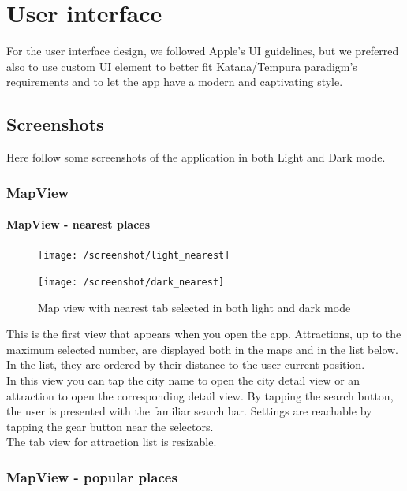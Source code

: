 \documentclass[a4paper, 11pt, parskip=half]{scrreprt}
\theoremstyle{definition}
\begin{document}
\chapter{User interface}
For the user interface design, we followed Apple's UI guidelines, but we preferred also to use custom UI element to better fit Katana/Tempura paradigm's requirements and to let the app have a modern and captivating style.  

\section{Screenshots}
Here follow some screenshots of the application in both Light and Dark mode.

\label{section:mapview}
\subsection{MapView}

\subsubsection{MapView - nearest places}

\begin{figure}[H]
	\centering
	\begin{minipage}{.5\textwidth}
  	\centering
  	\texttt{[image: /screenshot/light\_nearest]}
  	\label{fig:test1}
	\end{minipage}%
	\begin{minipage}{.5\textwidth}
  	\centering
  	\texttt{[image: /screenshot/dark\_nearest]}
  	\label{fig:test2}
	\end{minipage}
	\caption{Map view with nearest tab selected in both light and dark mode}
\end{figure}

This is the first view that appears when you open the app. Attractions, up to the maximum selected number, are displayed both in the maps and in the list below. In the list, they are ordered by their distance to the user current position.
\\In this view you can tap the city name to open the city detail view or an attraction to open the corresponding detail view. By tapping the search button, the user is presented with the familiar search bar. Settings are reachable by tapping the gear button near the selectors.
\\The tab view for attraction list is resizable.

\subsection{MapView - popular places}
\end{document}
